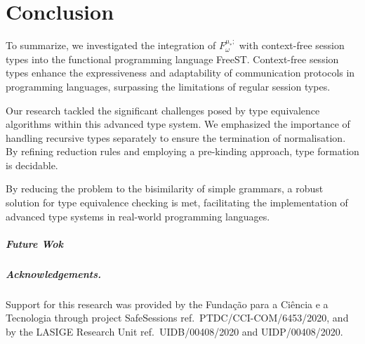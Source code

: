 
\chapter{Conclusion}

To summarize, we investigated the integration of  $F^{\mu_*;}_\omega$ with context-free session types into the functional programming language FreeST. Context-free session types enhance the expressiveness and adaptability of communication protocols in programming languages, surpassing the limitations of regular session types. 

Our research tackled the significant challenges posed by type equivalence algorithms within this advanced type system. We emphasized the importance of handling recursive types separately to ensure the termination of normalisation. By refining reduction rules and employing a pre-kinding approach, type formation is decidable.

By reducing the problem to the bisimilarity of simple grammars, a robust solution for type equivalence checking is met, facilitating the implementation of advanced type systems in real-world programming languages.

\paragraph{Future Wok}

  
\medskip

\paragraph{Acknowledgements.}
  Support for this research was provided by the Fundação para a Ciência e a
  Tecnologia through project SafeSessions ref.\ PTDC/CCI-COM/6453/2020, and by the
  LASIGE Research Unit ref.\ UIDB/00408/2020
  and UIDP/00408/2020.
